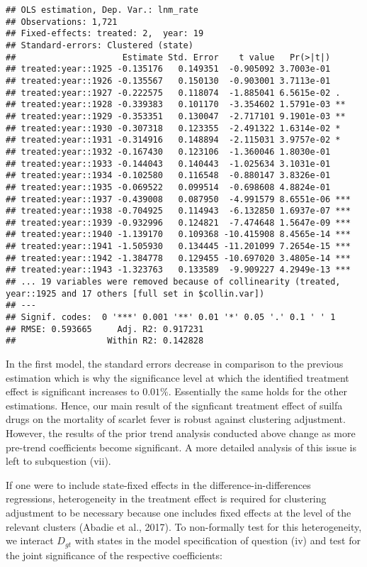 \documentclass[
]{article}
\begin{document}
\begin{verbatim}
## OLS estimation, Dep. Var.: lnm_rate
## Observations: 1,721 
## Fixed-effects: treated: 2,  year: 19
## Standard-errors: Clustered (state) 
##                     Estimate Std. Error    t value   Pr(>|t|)    
## treated:year::1925 -0.135176   0.149351  -0.905092 3.7003e-01    
## treated:year::1926 -0.135567   0.150130  -0.903001 3.7113e-01    
## treated:year::1927 -0.222575   0.118074  -1.885041 6.5615e-02 .  
## treated:year::1928 -0.339383   0.101170  -3.354602 1.5791e-03 ** 
## treated:year::1929 -0.353351   0.130047  -2.717101 9.1901e-03 ** 
## treated:year::1930 -0.307318   0.123355  -2.491322 1.6314e-02 *  
## treated:year::1931 -0.314916   0.148894  -2.115031 3.9757e-02 *  
## treated:year::1932 -0.167430   0.123106  -1.360046 1.8030e-01    
## treated:year::1933 -0.144043   0.140443  -1.025634 3.1031e-01    
## treated:year::1934 -0.102580   0.116548  -0.880147 3.8326e-01    
## treated:year::1935 -0.069522   0.099514  -0.698608 4.8824e-01    
## treated:year::1937 -0.439008   0.087950  -4.991579 8.6551e-06 ***
## treated:year::1938 -0.704925   0.114943  -6.132850 1.6937e-07 ***
## treated:year::1939 -0.932996   0.124821  -7.474648 1.5647e-09 ***
## treated:year::1940 -1.139170   0.109368 -10.415908 8.4565e-14 ***
## treated:year::1941 -1.505930   0.134445 -11.201099 7.2654e-15 ***
## treated:year::1942 -1.384778   0.129455 -10.697020 3.4805e-14 ***
## treated:year::1943 -1.323763   0.133589  -9.909227 4.2949e-13 ***
## ... 19 variables were removed because of collinearity (treated, year::1925 and 17 others [full set in $collin.var])
## ---
## Signif. codes:  0 '***' 0.001 '**' 0.01 '*' 0.05 '.' 0.1 ' ' 1
## RMSE: 0.593665     Adj. R2: 0.917231
##                  Within R2: 0.142828
\end{verbatim}

In the first model, the standard errors decrease in comparison to the
previous estimation which is why the significance level at which the
identified treatment effect is significant increases to \(0.01\%\).
Essentially the same holds for the other estimations. Hence, our main
result of the signficant treatment effect of suilfa drugs on the
mortality of scarlet fever is robust against clustering adjustment.
However, the results of the prior trend analysis conducted above change
as more pre-trend coefficients become significant. A more detailed
analysis of this issue is left to subquestion (vii).

If one were to include state-fixed effects in the
difference-in-differences regressions, heterogeneity in the treatment
effect is required for clustering adjustment to be necessary because one
includes fixed effects at the level of the relevant clusters (Abadie et
al., 2017). To non-formally test for this heterogeneity, we interact
\(D_{gt}\) with states in the model specification of question (iv) and
test for the joint significance of the respective coefficients:
\end{document}
